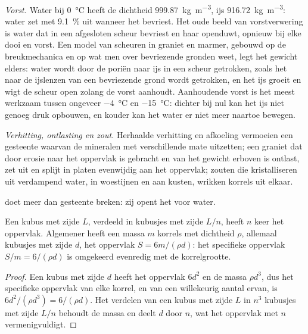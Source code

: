 \emph{Vorst.} Water bij \qty{0}{\celsius} heeft de dichtheid \qty{999.87}{kg.m^{-3}}, ijs \qty{916.72}{kg.m^{-3}}: water zet met \qty{9.1}{\percent} uit wanneer het bevriest. Het oude beeld van vorstverwering is
water dat in een afgesloten scheur bevriest en haar openduwt, opnieuw bij elke dooi en vorst. Een model van scheuren in graniet en marmer, gebouwd op de breukmechanica en op wat men over bevriezende gronden weet, legt het gewicht elders: water wordt door de poriën naar ijs in een scheur getrokken, zoals het naar de ijslenzen van een bevriezende grond wordt getrokken, en het ijs groeit en wigt de scheur open zolang de vorst aanhoudt. Aanhoudende vorst is het meest werkzaam tussen ongeveer \qty{-4}{\celsius} en \qty{-15}{\celsius}: dichter bij nul kan het ijs niet genoeg druk opbouwen, en kouder kan het water er niet meer naartoe bewegen.

\emph{Verhitting, ontlasting en zout.} Herhaalde verhitting en afkoeling vermoeien een gesteente waarvan de mineralen met verschillende mate uitzetten; een graniet dat door erosie naar het oppervlak is gebracht en van het gewicht erboven is ontlast, zet uit en splijt in platen evenwijdig aan het oppervlak; zouten die kristalliseren uit verdampend water, in woestijnen en aan kusten, wrikken korrels uit elkaar.

 doet meer dan gesteente breken: zij opent het voor water.

\begin{proposition}\label{prop:b1:weathering-clays:surface}
Een kubus met zijde $L$, verdeeld in kubusjes met zijde $L/n$, heeft $n$ keer het oppervlak. Algemener heeft een massa $m$ korrels met dichtheid $\rho$, allemaal kubusjes met zijde $d$, het oppervlak $S = 6m/(\rho d)$: het specifieke oppervlak $S/m =
6/(\rho d)$ is omgekeerd evenredig met de korrelgrootte.
\end{proposition}

\begin{proof}
Een kubus met zijde $d$ heeft het oppervlak $6d^2$ en de massa $\rho d^3$, dus het specifieke oppervlak van elke korrel, en van een willekeurig aantal ervan, is $6d^2/(\rho d^3)
= 6/(\rho d)$. Het verdelen van een kubus met zijde $L$ in $n^3$ kubusjes met zijde $L/n$ behoudt de massa en deelt $d$ door $n$, wat het oppervlak met $n$ vermenigvuldigt.
\end{proof}

